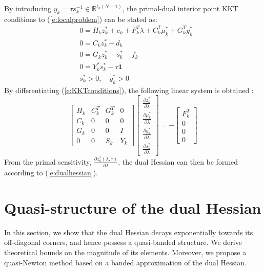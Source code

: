 By introducing $y_k = \tau s_k^{-1} \in \mathbb{R}^{t_k (N + 1)}$, the primal-dual interior point KKT conditions to (\ref{e:localproblem}) can be stated as:
\begin{subequations} \label{e:KKTconditions}
\begin{align}
& 0 = H_k z_k^* + c_k + F_k^T \lambda + C_k^T \mu_k^* + G_k^T y_k^* \\
& 0 = C_k z_k^* - d_k \\
& 0 = G_k z_k^* + s_k^* - f_k \\
& 0 = Y_k^* s_k^* - \tau \mathbf{1} \\
& s_k^* > 0, \quad y_k^* > 0
\end{align}
\end{subequations}
By differentiating (\ref{e:KKTconditions}), the following linear system is obtained \cite{Klintberg2014}:
\begin{equation}
\label{e:SensitivityLambda}
\left[ \begin{array}{cccc}
H_k & C_k^T & G_k^T & 0 \\
C_k & 0 & 0 & 0 \\
G_k & 0 & 0 & I \\
0 & 0 & S_k & Y_k
\end{array} \right]
\left[ \begin{array}{c}
\frac{\partial z_k^*}{\partial \lambda} \\
\frac{\partial \mu_k^*}{\partial \lambda} \\
\frac{\partial y_k^*}{\partial \lambda} \\
\frac{\partial s_k^*}{\partial \lambda}
\end{array} \right] = -
\left[ \begin{array}{c}
F_k^T \\
0 \\
0 \\
0
\end{array} \right]
\end{equation}
From the primal sensitivity, $\frac{\partial z_k^*(\lambda, \tau)}{\partial \lambda}$, the dual Hessian can then be formed according to (\ref{e:dualhessian}).

\section{Quasi-structure of the dual Hessian} \label{S:TheoreticalDecay}

In this section, we show that the dual Hessian decays exponentially towards its off-diagonal corners, and hence possess a quasi-banded structure. We derive theoretical bounds on the magnitude of its elements. Moreover, we propose a quasi-Newton method based on a banded approximation of the dual Hessian.

